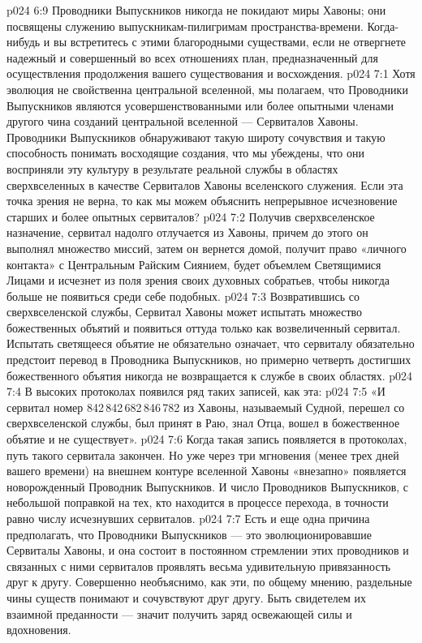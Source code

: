 \vs p024 6:9 \pc Проводники Выпускников никогда не покидают миры Хавоны; они посвящены служению выпускникам\hyp{}пилигримам пространства\hyp{}времени. Когда\hyp{}нибудь и вы встретитесь с этими благородными существами, если не отвергнете надежный и совершенный во всех отношениях план, предназначенный для осуществления продолжения вашего существования и восхождения.
\vs p024 7:1 Хотя эволюция не свойственна центральной вселенной, мы полагаем, что Проводники Выпускников являются усовершенствованными или более опытными членами другого чина созданий центральной вселенной --- Сервиталов Хавоны. Проводники Выпускников обнаруживают такую широту сочувствия и такую способность понимать восходящие создания, что мы убеждены, что они восприняли эту культуру в результате реальной службы в областях сверхвселенных в качестве Сервиталов Хавоны вселенского служения. Если эта точка зрения не верна, то как мы можем объяснить непрерывное исчезновение старших и более опытных сервиталов?
\vs p024 7:2 Получив сверхвселенское назначение, сервитал надолго отлучается из Хавоны, причем до этого он выполнял множество миссий, затем он вернется домой, получит право «личного контакта» с Центральным Райским Сиянием, будет объемлем Светящимися Лицами и исчезнет из поля зрения своих духовных собратьев, чтобы никогда больше не появиться среди себе подобных.
\vs p024 7:3 Возвратившись со сверхвселенской службы, Сервитал Хавоны может испытать множество божественных объятий и появиться оттуда только как возвеличенный сервитал. Испытать светящееся объятие не обязательно означает, что сервиталу обязательно предстоит перевод в Проводника Выпускников, но примерно четверть достигших божественного объятия никогда не возвращается к службе в своих областях.
\vs p024 7:4 \pc В высоких протоколах появился ряд таких записей, как эта:
\vs p024 7:5 «И сервитал номер 842\,842\,682\,846\,782 из Хавоны, называемый Судной, перешел со сверхвселенской службы, был принят в Раю, знал Отца, вошел в божественное объятие и не существует».
\vs p024 7:6 Когда такая запись появляется в протоколах, путь такого сервитала закончен. Но уже через три мгновения (менее трех дней вашего времени) на внешнем контуре вселенной Хавоны «внезапно» появляется новорожденный Проводник Выпускников. И число Проводников Выпускников, с небольшой поправкой на тех, кто находится в процессе перехода, в точности равно числу исчезнувших сервиталов.
\vs p024 7:7 \pc Есть и еще одна причина предполагать, что Проводники Выпускников --- это эволюционировавшие Сервиталы Хавоны, и она состоит в постоянном стремлении этих проводников и связанных с ними сервиталов проявлять весьма удивительную привязанность друг к другу. Совершенно необъяснимо, как эти, по общему мнению, раздельные чины существ понимают и сочувствуют друг другу. Быть свидетелем их взаимной преданности --- значит получить заряд освежающей силы и вдохновения.
